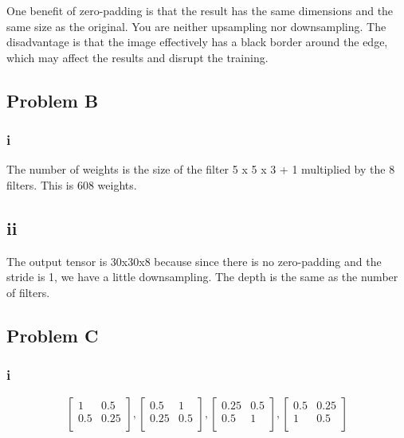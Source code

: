 \documentclass[12pt]{article} %
\begin{document}
One benefit of zero-padding is that the result has the same dimensions and the same size as the original. You are neither upsampling nor downsampling. The disadvantage is that the image effectively has a black border around the edge, which may affect the results and disrupt the training.

\subsection{Problem B}

\subsubsection{i}
The number of weights is the size of the filter 5 x 5 x 3 + 1 multiplied by the 8 filters. This is 608 weights.

\subsection{ii}
The output tensor is 30x30x8 because since there is no zero-padding and the stride is 1, we have a little downsampling. The depth is the same as the number of filters.

\subsection{Problem C}
\subsubsection{i}

$$
\begin{bmatrix}
    1 & 0.5  \\
    0.5 & 0.25  \\
\end{bmatrix}
,
\begin{bmatrix}
    0.5 & 1  \\
    0.25 & 0.5  \\
\end{bmatrix}
,
\begin{bmatrix}
    0.25 & 0.5  \\
    0.5 & 1  \\
\end{bmatrix}
,
\begin{bmatrix}
    0.5 & 0.25  \\
    1 & 0.5  \\
\end{bmatrix}
$$
\end{document}
